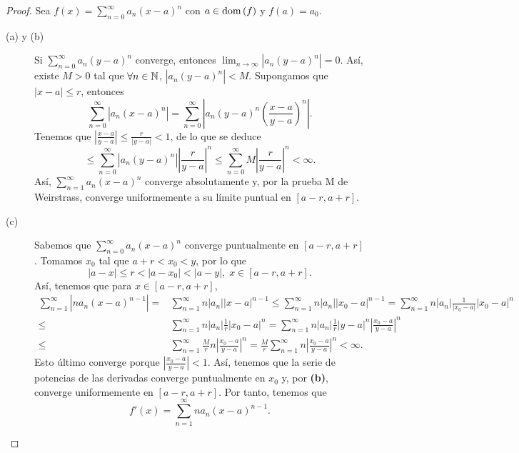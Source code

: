 \begin{proof}
Sea $\displaystyle f\left(x\right) = \sum^{\infty}_{n = 0}a_{n}\left(x-a\right)^{n} $ con $\displaystyle a \in \operatorname{dom}\left(f\right) $ y $\displaystyle f\left(a\right) = a_{0} $. 
\begin{description}
\item[(a) y (b)] Si $\displaystyle \sum^{\infty}_{n = 0}a_{n}\left(y-a\right)^{n} $ converge, entonces $\displaystyle \lim_{n \to \infty} \left|a_{n}\left(y-a\right)^{n}\right| = 0 $. Así, existe $\displaystyle M > 0 $ tal que $\displaystyle \forall n \in \mathbb{N} $, $\displaystyle \left|a_{n}\left(y-a\right)^{n}\right|<M $. Supongamos que $\displaystyle \left|x-a\right| \leq r $, entonces
	\[\sum^{\infty}_{n = 0} \left|a_{n}\left(x-a\right)^{n}\right| = \sum^{\infty}_{n = 0} \left|a_{n}\left(y-a\right)^{n}\left(\frac{x-a}{y-a}\right)^{n}\right| .\]
Tenemos que $\displaystyle \left|\frac{x-a}{y-a}\right| \leq \frac{r}{ \left|y-a\right|} < 1 $, de lo que se deduce
\[\leq \sum^{\infty}_{n = 0} \left|a_{n}\left(y-a\right)^{n}\right| \left|\frac{r}{y-a}\right|^{n} \leq \sum^{\infty}_{n = 0}M\left|\frac{r}{y-a}\right| ^{n} < \infty  .\]
Así, $\displaystyle \sum^{\infty}_{n = 1}a_{n}\left(x-a\right)^{n} $ converge absolutamente y, por la prueba M de Weirstrass, converge uniformemente a su límite puntual en $\displaystyle \left[a-r, a + r\right]  $. 
\item[(c)] Sabemos que $\displaystyle \sum^{\infty}_{n = 0}a_{n}\left(x-a\right)^{n} $ converge puntualmente en $\displaystyle \left[a-r, a + r\right]  $. Tomamos $\displaystyle x_{0} $ tal que $\displaystyle a + r < x_{0} < y $, por lo que
	\[ \left|a-x\right| \leq r < \left|a-x_{0}\right| < \left|a-y\right|, \; x \in \left[a-r, a + r\right]  .\]
	Así, tenemos que para $\displaystyle x \in \left[a-r, a + r\right]  $,
\[
\begin{split}
	\sum^{\infty}_{n = 1} \left|n a_{n}\left(x-a\right)^{n-1}\right| = & \sum^{\infty}_{n = 1}n \left|a_{n}\right| \left|x-a\right|^{n-1}\leq \sum^{\infty}_{n = 1}n \left|a_{n}\right| \left|x_{0}-a\right|^{n-1} 
	=  \sum^{\infty}_{n = 1}n \left|a_{n}\right| \frac{1}{ \left| x_{0}-a\right|} \left|x_{0}-a\right|^{n} \\
	\leq & \sum^{\infty}_{n = 1}n \left|a_{n}\right| \frac{1}{r} \left|x_{0}-a\right|^{n}
	= \sum^{\infty}_{n = 1}n \left|a_{n}\right|\frac{1}{r} \left|y - a\right|^{n} \left|\frac{x_{0}-a}{y-a}\right|^{n}  \\
	\leq & \sum^{\infty}_{n = 1}\frac{M}{r}n \left|\frac{x_{0}-a}{y-a}\right|^{n} 
	=  \frac{M}{r}\sum^{\infty}_{n = 1}n \left|\frac{x_{0}-a}{y-a}\right|^{n} < \infty .
\end{split}
\]
Esto último converge porque $\displaystyle \left|\frac{x_{0}-a}{y - a}\right| < 1 $. Así, tenemos que la serie de potencias de las derivadas converge puntualmente en $\displaystyle x_{0} $ y, por \textbf{(b)}, converge uniformemente en $\displaystyle \left[a-r, a +r\right]  $. Por tanto, tenemos que 
\[f'\left(x\right) = \sum^{\infty}_{n = 1}na_{n}\left(x-a\right)^{n-1} .\]
\end{description}
\end{proof}
